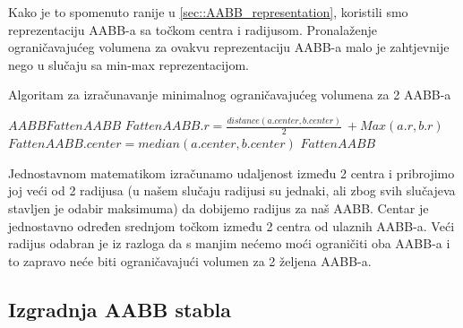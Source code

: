 Kako je to spomenuto ranije u \ref{sec::AABB_representation}, koristili smo reprezentaciju AABB-a sa točkom centra i radijusom. Pronalaženje ograničavajućeg volumena za ovakvu reprezentaciju AABB-a malo je zahtjevnije nego u slučaju sa min-max reprezentacijom.
\begin{algorithm}
\caption{Algoritam za izračunavanje minimalnog ograničavajućeg volumena za 2 AABB-a}
\label{alg:fatten_aabb}
\begin{algorithmic}
		\State $AABB FattenAABB$ 
		\State$FattenAABB.r =\frac{distance(a.center,b.center)}{2}\ + Max(a.r,b.r)$
		\State$FattenAABB.center = median(a.center,b.center)$
		\State \Return $FattenAABB$
	
	\EndFunction
\end{algorithmic}
\end{algorithm}
\newline
Jednostavnom matematikom izračunamo udaljenost između 2 centra i pribrojimo joj veći od 2 radijusa (u našem slučaju radijusi su jednaki, ali zbog svih slučajeva stavljen je odabir maksimuma) da dobijemo radijus za naš AABB. Centar je jednostavno određen srednjom točkom između 2 centra od ulaznih AABB-a. Veći radijus odabran je iz razloga da s manjim nećemo moći ograničiti oba AABB-a i to zapravo neće biti ograničavajući volumen za 2 željena AABB-a. 
\subsection{Izgradnja AABB stabla}

